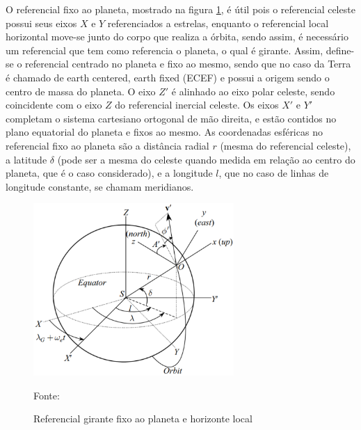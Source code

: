 O referencial fixo ao planeta, mostrado na figura \ref{fig:PLANETAZUM}, é útil pois o referencial celeste possui seus eixos $X$ e $Y$ referenciados a estrelas, enquanto o referencial local horizontal move-se junto do corpo que realiza a órbita, sendo assim, é necessário um referencial que tem como referencia o planeta, o qual é girante. Assim, define-se o referencial centrado no planeta e fixo ao mesmo, sendo que no caso da Terra é chamado de earth centered, earth fixed (ECEF) e possui a origem sendo o centro de massa do planeta. O eixo $Z'$ é alinhado ao eixo polar celeste, sendo coincidente com o eixo $Z$ do referencial inercial celeste. Os eixos $X'$ e $Y'$ completam o sistema cartesiano ortogonal de mão direita, e estão contidos no plano equatorial do planeta e fixos ao mesmo. As coordenadas esféricas no referencial fixo ao planeta são a distância radial $r$ (mesma do referencial celeste), a latitude $\delta$ (pode ser a mesma do celeste quando medida em relação ao centro do planeta, que é o caso considerado), e a longitude $l$, que no caso de linhas de longitude constante, se chamam meridianos. 

\begin{figure}[h]
        \centering
        \includegraphics[width=3in]{figuras/PLANETAZUM.png}
        \caption{Referencial girante fixo ao planeta e horizonte local}
        \footnotesize Fonte: \cite{livro:andre}
        \label{fig:PLANETAZUM}
\end{figure} 

